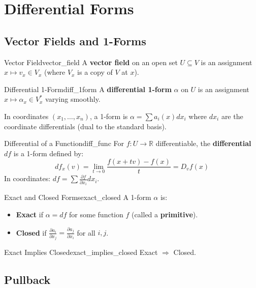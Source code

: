 \documentclass[11pt, letterpaper, openany]{book}
\begin{document}
\chapter{Differential Forms}

\section{Vector Fields and 1-Forms}

\begin{defn}{Vector Field}{vector_field}
A \textbf{vector field} on an open set $U \subseteq V$ is an assignment $x \mapsto v_x \in V_x$ (where $V_x$ is a copy of $V$ at $x$).
\end{defn}

\begin{defn}{Differential 1-Form}{diff_1form}
A \textbf{differential 1-form} $\alpha$ on $U$ is an assignment $x \mapsto \alpha_x \in V_x^*$ varying smoothly.
\end{defn}

In coordinates $(x_1, \ldots, x_n)$, a 1-form is $\alpha = \sum a_i(x) dx_i$ where $dx_i$ are the coordinate differentials (dual to the standard basis).

\begin{defn}{Differential of a Function}{diff_func}
For $f: U \to \mathbb{R}$ differentiable, the \textbf{differential} $df$ is a 1-form defined by:
\[
df_x(v) = \lim_{t \to 0} \frac{f(x + tv) - f(x)}{t} = D_v f(x)
\]
In coordinates: $df = \sum \frac{\partial f}{\partial x_i} dx_i$.
\end{defn}

\begin{defn}{Exact and Closed Forms}{exact_closed}
A 1-form $\alpha$ is:
\begin{itemize}
    \item \textbf{Exact} if $\alpha = df$ for some function $f$ (called a \textbf{primitive}).
    \item \textbf{Closed} if $\frac{\partial a_i}{\partial x_j} = \frac{\partial a_j}{\partial x_i}$ for all $i, j$.
\end{itemize}
\end{defn}

\begin{thm}{Exact Implies Closed}{exact_implies_closed}
Exact $\Rightarrow$ Closed.
\end{thm}

\section{Pullback}
\end{document}
